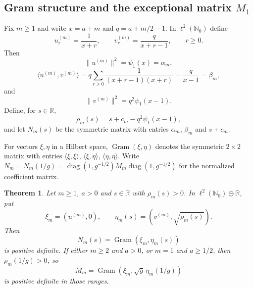 \documentclass[11pt,a4paper]{amsart}
\numberwithin{equation}{section}
\theoremstyle{plain}
\newtheorem{theorem}{Theorem}[section]
\theoremstyle{definition}
\newcommand{\R}{\mathbb R}
\newcommand{\N}{\mathbb N}
\newcommand{\diag}{\operatorname{diag}}
\begin{document}
\subsection{Gram structure and the exceptional matrix \texorpdfstring{\(M_1\)}{M1}}\label{subsec:gram}

Fix \(m\ge1\) and write \(x=a+m\) and \(q=a+m/2-1\).
In \(\ell^2(\N_0)\) define
\[
 u_r^{(m)}=\frac1{x+r},
 \qquad
 v_r^{(m)}=\frac{q}{x+r-1},
 \qquad r\ge0.
\]
Then
\begin{equation}\label{eq:u-norm}
 \|u^{(m)}\|^2=\psi_1(x)=\alpha_m,
\end{equation}
\begin{equation}\label{eq:uv-cross}
 \langle u^{(m)},v^{(m)}\rangle
 =q\sum_{r\ge0}\frac1{(x+r-1)(x+r)}
 =\frac q{x-1}=\beta_m,
\end{equation}
and
\begin{equation}\label{eq:v-norm}
 \|v^{(m)}\|^2=q^2\psi_1(x-1).
\end{equation}
Define, for \(s\in\R\),
\begin{equation}\label{eq:rho-m}
 \rho_m(s)=s+c_m-q^2\psi_1(x-1),
\end{equation}
and let \(N_m(s)\) be the symmetric matrix with entries \(\alpha_m\), \(\beta_m\) and \(s+c_m\).

For vectors \(\xi,\eta\) in a Hilbert space, \(\operatorname{Gram}(\xi,\eta)\) denotes the symmetric \(2\times2\) matrix with entries \(\langle\xi,\xi\rangle\), \(\langle\xi,\eta\rangle\), \(\langle\eta,\eta\rangle\).  Write \(N_m=N_m(1/g)=\diag(1,g^{-1/2})M_m\diag(1,g^{-1/2})\) for the normalized coefficient matrix.

\begin{theorem}\label{thm:gram}
Let \(m\ge1\), \(a>0\) and \(s\in\R\) with \(\rho_m(s)>0\).  In \(\ell^2(\N_0)\oplus\R\), put
\[
 \xi_m=(u^{(m)},0),
 \qquad
 \eta_m(s)=(v^{(m)},\sqrt{\rho_m(s)}).
\]
Then
\begin{equation}\label{eq:Nm-gram}
 N_m(s)=\operatorname{Gram}(\xi_m,\eta_m(s))
\end{equation}
is positive definite.  If either \(m\ge2\) and \(a>0\), or \(m=1\) and \(a\ge1/2\), then \(\rho_m(1/g)>0\), so
\begin{equation}\label{eq:Mm-gram}
 M_m=\operatorname{Gram}(\xi_m,\sqrt g\,\eta_m(1/g))
\end{equation}
is positive definite in those ranges.
\end{theorem}
\end{document}

